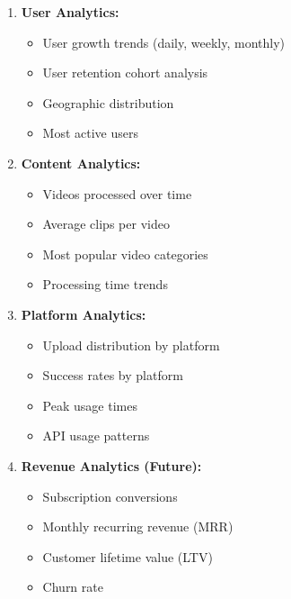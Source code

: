 \begin{enumerate}
    \item \textbf{User Analytics:}
    \begin{itemize}
        \item User growth trends (daily, weekly, monthly)
        \item User retention cohort analysis
        \item Geographic distribution
        \item Most active users
    \end{itemize}
    
    \item \textbf{Content Analytics:}
    \begin{itemize}
        \item Videos processed over time
        \item Average clips per video
        \item Most popular video categories
        \item Processing time trends
    \end{itemize}
    
    \item \textbf{Platform Analytics:}
    \begin{itemize}
        \item Upload distribution by platform
        \item Success rates by platform
        \item Peak usage times
        \item API usage patterns
    \end{itemize}
    
    \item \textbf{Revenue Analytics (Future):}
    \begin{itemize}
        \item Subscription conversions
        \item Monthly recurring revenue (MRR)
        \item Customer lifetime value (LTV)
        \item Churn rate
    \end{itemize}
\end{enumerate}

